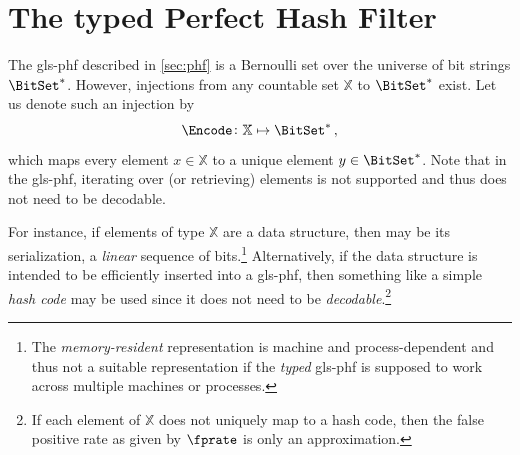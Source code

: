 \documentclass[ ../main.tex]{subfiles}
\begin{document}
\section{The typed Perfect Hash Filter}
\label{sec:typed_phf}
The \gls{gls-phf} described in \cref{sec:phf} is a Bernoulli set over the universe of bit strings $\BitSet^*$. However, injections from any countable set $\mathbb{X}$ to $\BitSet^*$ exist. Let us denote such an injection by
\begin{equation}
    \Encode \colon \mathbb{X} \mapsto \BitSet^*\,,
\end{equation}
which maps every element $x \in \mathbb{X}$ to a unique element $y \in \BitSet^*$. Note that in the \gls{gls-phf}, iterating over (or retrieving) elements is not supported and thus \Encode does not need to be decodable.

For instance, if elements of type $\mathbb{X}$ are a data structure, then \Encode may be its serialization, a \emph{linear} sequence of bits.\footnote{The \emph{memory-resident} representation is machine and process-dependent and thus not a suitable representation if the \emph{typed} \gls{gls-phf} is supposed to work across multiple machines or processes.} Alternatively, if the data structure is intended to be efficiently inserted into a \gls{gls-phf}, then something like a simple \emph{hash code} may be used since it does not need to be \emph{decodable}.\footnote{If each element of $\mathbb{X}$ does not uniquely map to a hash code, then the false positive rate as given by $\fprate$ is only an approximation.}
\end{document}
